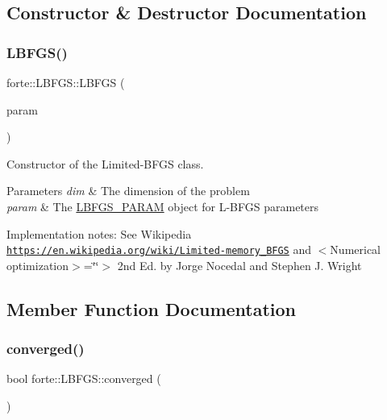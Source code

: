 \subsection{Constructor \& Destructor Documentation}
\mbox{\label{classforte_1_1_l_b_f_g_s_ad3372e79915de6ac76aa5367a3d744e6}} 
\subsubsection{\texorpdfstring{L\+B\+F\+G\+S()}{LBFGS()}}
{\footnotesize\ttfamily forte\+::\+L\+B\+F\+G\+S\+::\+L\+B\+F\+GS (\begin{DoxyParamCaption}\item[{std\+::shared\+\_\+ptr$<$ \mbox{\hyperlink{classforte_1_1_l_b_f_g_s___p_a_r_a_m}{L\+B\+F\+G\+S\+\_\+\+P\+A\+R\+AM}} $>$}]{param }\end{DoxyParamCaption})}



Constructor of the Limited-\/\+B\+F\+GS class. 


\begin{DoxyParams}{Parameters}
{\em dim} & The dimension of the problem \\
\hline
{\em param} & The \mbox{\hyperlink{classforte_1_1_l_b_f_g_s___p_a_r_a_m}{L\+B\+F\+G\+S\+\_\+\+P\+A\+R\+AM}} object for L-\/\+B\+F\+GS parameters\\
\hline
\end{DoxyParams}
Implementation notes\+: See Wikipedia \href{https://en.wikipedia.org/wiki/Limited-memory_BFGS}{\tt https\+://en.\+wikipedia.\+org/wiki/\+Limited-\/memory\+\_\+\+B\+F\+GS} and $<$\+Numerical optimization$>$=\char`\"{}\char`\"{}$>$ 2nd Ed. by Jorge Nocedal and Stephen J. Wright 

\subsection{Member Function Documentation}
\mbox{\label{classforte_1_1_l_b_f_g_s_ab42bf7fe9e2a7eafd004773f9b606b65}} 
\subsubsection{\texorpdfstring{converged()}{converged()}}
{\footnotesize\ttfamily bool forte\+::\+L\+B\+F\+G\+S\+::converged (\begin{DoxyParamCaption}{ }\end{DoxyParamCaption})\hspace{0.3cm}{\ttfamily [inline]}}



